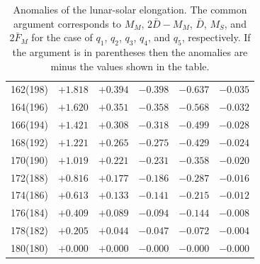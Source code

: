 \begin{table}[!h]
\begin{tabular}{crrrrr}
162(198) & $+1.818$ & $+0.394$ & $-0.398$ & $-0.637$ & $-0.035$\\
164(196) & $+1.620$ & $+0.351$ & $-0.358$ & $-0.568$ & $-0.032$\\
166(194) & $+1.421$ & $+0.308$ & $-0.318$ & $-0.499$ & $-0.028$\\
168(192) & $+1.221$ & $+0.265$ & $-0.275$ & $-0.429$ & $-0.024$\\
170(190) & $+1.019$ & $+0.221$ & $-0.231$ & $-0.358$ & $-0.020$\\
172(188) & $+0.816$ & $+0.177$ & $-0.186$ & $-0.287$ & $-0.016$\\
174(186) & $+0.613$ & $+0.133$ & $-0.141$ & $-0.215$ & $-0.012$\\
176(184) & $+0.409$ & $+0.089$ & $-0.094$ & $-0.144$ & $-0.008$\\
178(182) & $+0.205$ & $+0.044$ & $-0.047$ & $-0.072$ & $-0.004$\\
180(180) & $+0.000$ & $+0.000$ & $-0.000$ & $-0.000$ & $-0.000$\\
\end{tabular}
\caption{Anomalies of the lunar-solar elongation. The common argument corresponds to
$M_M$, $2\bar{D}-M_M$, $\bar{D}$, $M_S$, and $2\bar{F}_M$ for the case of
$q_1$, $q_2$, $q_3$, $q_4$, and $q_5$, respectively. If the argument is
in parentheses then the anomalies are minus the values shown
in the table. }\label{telona}
\end{table}

